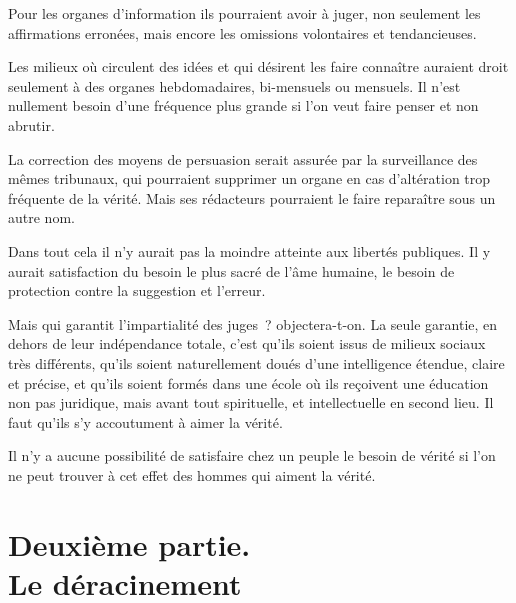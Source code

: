 \documentclass[french,twoside]{book} %
\begin{document}
\par
Pour les organes d'information ils pourraient avoir à juger, non seulement les affirmations erronées, mais encore les omissions volontaires et tendancieuses.\par
Les milieux où circulent des idées et qui désirent les faire connaître auraient droit seulement à des organes hebdomadaires, bi-mensuels ou mensuels. Il n'est nullement besoin d'une fréquence plus grande si l'on veut faire penser et non abrutir.\par
La correction des moyens de persuasion serait assurée par la surveillance des mêmes tribunaux, qui pourraient supprimer un organe en cas d'altération trop fréquente de la vérité. Mais ses rédacteurs pourraient le faire reparaître sous un autre nom.\par
Dans tout cela il n'y aurait pas la moindre atteinte aux libertés publiques. Il y aurait satisfaction du besoin le plus sacré de l'âme humaine, le besoin de protection contre la suggestion et l'erreur.\par
Mais qui garantit l'impartialité des juges ? objectera-t-on. La seule garantie, en dehors de leur indépendance totale, c'est qu'ils soient issus de milieux sociaux très différents, qu'ils soient naturellement doués d'une intelligence étendue, claire et précise, et qu'ils soient formés dans une école où ils reçoivent une éducation non pas juridique, mais avant tout spirituelle, et intellectuelle en second lieu. Il faut qu'ils s'y accoutument à aimer la vérité.\par
Il n'y a aucune possibilité de satisfaire chez un peuple le besoin de vérité si l'on ne peut trouver à cet effet des hommes qui aiment la vérité.
\section[Deuxième partie. Le déracinement]{Deuxième partie. \\
Le déracinement}\renewcommand{\leftmark}{Deuxième partie. \\
Le déracinement}
\end{document}
